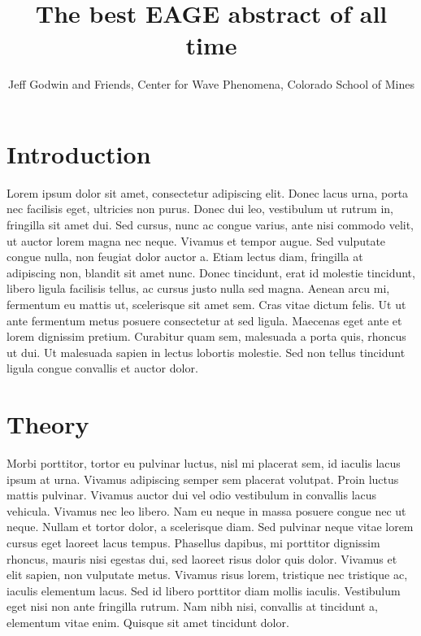 
\title{The best EAGE abstract of all time}
\author{Jeff Godwin and Friends, Center for Wave Phenomena, Colorado School of Mines}

\maketitle

\section{Introduction}

Lorem ipsum dolor sit amet, consectetur adipiscing elit. Donec lacus urna, porta nec facilisis eget, ultricies non purus. Donec dui leo, vestibulum ut rutrum in, fringilla sit amet dui. Sed cursus, nunc ac congue varius, ante nisi commodo velit, ut auctor lorem magna nec neque. Vivamus et tempor augue. Sed vulputate congue nulla, non feugiat dolor auctor a. Etiam lectus diam, fringilla at adipiscing non, blandit sit amet nunc. Donec tincidunt, erat id molestie tincidunt, libero ligula facilisis tellus, ac cursus justo nulla sed magna. Aenean arcu mi, fermentum eu mattis ut, scelerisque sit amet sem. Cras vitae dictum felis. Ut ut ante fermentum metus posuere consectetur at sed ligula. Maecenas eget ante et lorem dignissim pretium. Curabitur quam sem, malesuada a porta quis, rhoncus ut dui. Ut malesuada sapien in lectus lobortis molestie. Sed non tellus tincidunt ligula congue convallis et auctor dolor.

\section{Theory}
Morbi porttitor, tortor eu pulvinar luctus, nisl mi placerat sem, id iaculis lacus ipsum at urna. Vivamus adipiscing semper sem placerat volutpat. Proin luctus mattis pulvinar. Vivamus auctor dui vel odio vestibulum in convallis lacus vehicula. Vivamus nec leo libero. Nam eu neque in massa posuere congue nec ut neque. Nullam et tortor dolor, a scelerisque diam. Sed pulvinar neque vitae lorem cursus eget laoreet lacus tempus. Phasellus dapibus, mi porttitor dignissim rhoncus, mauris nisi egestas dui, sed laoreet risus dolor quis dolor. Vivamus et elit sapien, non vulputate metus. Vivamus risus lorem, tristique nec tristique ac, iaculis elementum lacus. Sed id libero porttitor diam mollis iaculis. Vestibulum eget nisi non ante fringilla rutrum. Nam nibh nisi, convallis at tincidunt a, elementum vitae enim. Quisque sit amet tincidunt dolor.

